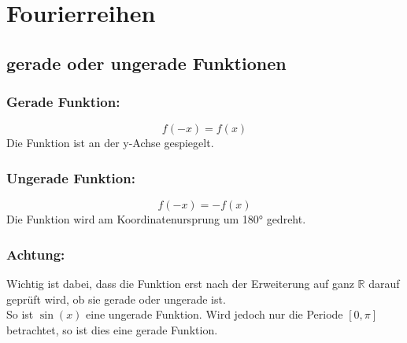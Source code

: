 



















\section{Fourierreihen}

\subsection{gerade oder ungerade Funktionen}

\subsubsection{Gerade Funktion: }
\[ \boxed{f(-x) = f(x)} \]
Die Funktion ist an der y-Achse gespiegelt. 
\subsubsection{Ungerade Funktion: }
\[ \boxed{f(-x) = -f(x)} \]
Die Funktion wird am Koordinatenursprung um 180° gedreht. 
\subsubsection{Achtung: }
Wichtig ist dabei, dass die Funktion erst nach der Erweiterung auf ganz $\mathbb{R}$ darauf geprüft wird, ob sie gerade oder ungerade ist. \\
So ist $\sin(x)$ eine ungerade Funktion. Wird jedoch nur die Periode $[0, \pi]$ betrachtet, so ist dies eine gerade Funktion. 


